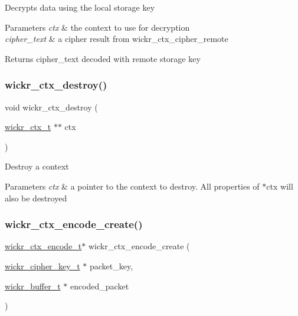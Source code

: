 Decrypts data using the local storage key


\begin{DoxyParams}{Parameters}
{\em ctx} & the context to use for decryption \\
\hline
{\em cipher\+\_\+text} & a cipher result from \textquotesingle{}wickr\+\_\+ctx\+\_\+cipher\+\_\+remote\textquotesingle{} \\
\hline
\end{DoxyParams}
\begin{DoxyReturn}{Returns}
\textquotesingle{}cipher\+\_\+text\textquotesingle{} decoded with remote storage key 
\end{DoxyReturn}
\mbox{\label{group__wickr__ctx_gaadfdef183c86992efc33b0d730c90327}} 
\subsubsection{\texorpdfstring{wickr\+\_\+ctx\+\_\+destroy()}{wickr\_ctx\_destroy()}}
{\footnotesize\ttfamily void wickr\+\_\+ctx\+\_\+destroy (\begin{DoxyParamCaption}\item[{\mbox{\hyperlink{structwickr__ctx}{wickr\+\_\+ctx\+\_\+t}} $\ast$$\ast$}]{ctx }\end{DoxyParamCaption})}

Destroy a context


\begin{DoxyParams}{Parameters}
{\em ctx} & a pointer to the context to destroy. All properties of \textquotesingle{}$\ast$ctx\textquotesingle{} will also be destroyed \\
\hline
\end{DoxyParams}
\mbox{\label{group__wickr__ctx_ga810ee459cb0ab1037b5fd1f983d0ded3}} 
\subsubsection{\texorpdfstring{wickr\+\_\+ctx\+\_\+encode\+\_\+create()}{wickr\_ctx\_encode\_create()}}
{\footnotesize\ttfamily \mbox{\hyperlink{structwickr__ctx__encode}{wickr\+\_\+ctx\+\_\+encode\+\_\+t}}$\ast$ wickr\+\_\+ctx\+\_\+encode\+\_\+create (\begin{DoxyParamCaption}\item[{\mbox{\hyperlink{structwickr__cipher__key}{wickr\+\_\+cipher\+\_\+key\+\_\+t}} $\ast$}]{packet\+\_\+key,  }\item[{\mbox{\hyperlink{structwickr__buffer}{wickr\+\_\+buffer\+\_\+t}} $\ast$}]{encoded\+\_\+packet }\end{DoxyParamCaption})}

